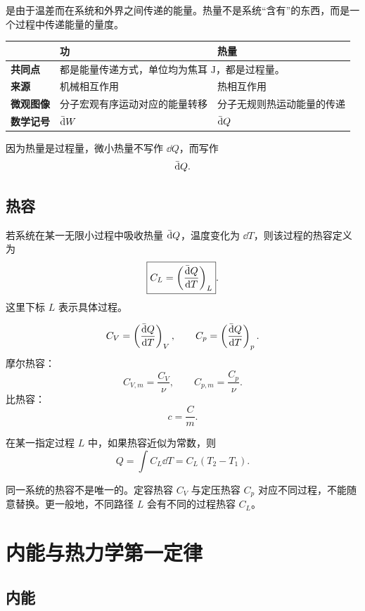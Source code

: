 是由于温差而在系统和外界之间传递的能量。热量不是系统“含有”的东西，而是一个过程中传递能量的量度。

\begin{KeyBox}[功与热量的相同点和区别]
\begin{tabularx}{\textwidth}{@{}>{\bfseries}lXX@{}}
 & 功 & 热量\\
\midrule
共同点 & \multicolumn{2}{X}{都是能量传递方式，单位均为焦耳 \(\mathrm J\)，都是过程量。}\\
来源 & 机械相互作用 & 热相互作用\\
微观图像 & 分子宏观有序运动对应的能量转移 & 分子无规则热运动能量的传递\\
数学记号 & \(\mathop{}\!\bar{\mathrm{d}} W\) & \(\mathop{}\!\bar{\mathrm{d}} Q\)\\
\end{tabularx}
\end{KeyBox}

因为热量是过程量，微小热量不写作 \(\dd Q\)，而写作
\[
  \mathop{}\!\bar{\mathrm{d}} Q.
\]

\subsection{热容}

若系统在某一无限小过程中吸收热量 \(\mathop{}\!\bar{\mathrm{d}} Q\)，温度变化为 \(\dd T\)，则该过程的热容定义为
\[
  \boxed{
  C_L=\left(\frac{\mathop{}\!\bar{\mathrm{d}} Q}{\mathop{}\!\mathrm{d} T}\right)_L
  }.
\]
这里下标 \(L\) 表示具体过程。

\begin{FormulaBox}[常用热容]
\[
  C_V=\left(\frac{\mathop{}\!\bar{\mathrm{d}} Q}{\mathop{}\!\mathrm{d} T}\right)_V,
  \qquad
  C_p=\left(\frac{\mathop{}\!\bar{\mathrm{d}} Q}{\mathop{}\!\mathrm{d} T}\right)_p.
\]
摩尔热容：
\[
  C_{V,m}=\frac{C_V}{\nu},
  \qquad
  C_{p,m}=\frac{C_p}{\nu}.
\]
比热容：
\[
  c=\frac{C}{m}.
\]
\end{FormulaBox}

在某一指定过程 \(L\) 中，如果热容近似为常数，则
\[
  Q=\int C_L\dd T=C_L(T_2-T_1).
\]

\begin{WarnBox}
同一系统的热容不是唯一的。定容热容 \(C_V\) 与定压热容 \(C_p\) 对应不同过程，不能随意替换。更一般地，不同路径 \(L\) 会有不同的过程热容 \(C_L\)。
\end{WarnBox}

\section{内能与热力学第一定律}

\subsection{内能}

